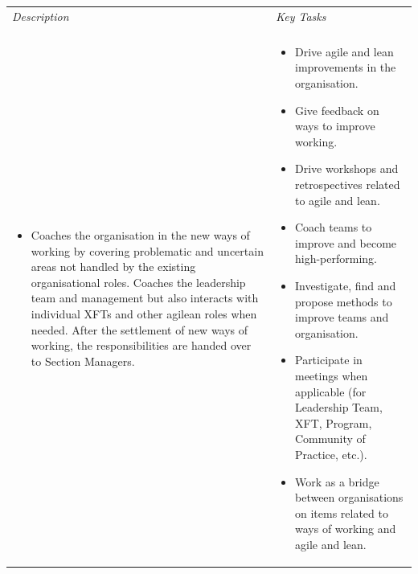 \begin{table}[h]
   \begin{tabularx}{\textwidth}{ | p{6.9cm} | p{6.9cm} | }
   
   \hline
   \emph{Description} & \emph{Key Tasks} \\ 
   \hhline{==}
   
   \multicolumn{2}{ | c | }{\textbf{Agile Coach}}
   
   \\ \hline
   
   \begin{itemize}[label={}, leftmargin=*, topsep=0pt, itemsep=0pt, partopsep=0pt]
     \item Coaches the organisation in the new ways of working by covering problematic and uncertain areas not handled by the existing organisational roles. Coaches the leadership team and management but also interacts with individual \acp{XFT} and other agilean roles when needed. After the settlement of new ways of working, the responsibilities are handed over to Section Managers. 
   \end{itemize} &
   
   \begin{itemize}[label={}, leftmargin=*, topsep=0pt, itemsep=0pt, partopsep=0pt]
     \item Drive agile and lean improvements in the organisation.
     \item Give feedback on ways to improve working.
     \item Drive workshops and retrospectives related to agile and lean.
     \item Coach teams to improve and become high-performing.
     \item Investigate, find and propose methods to improve teams and organisation.
     \item Participate in meetings when applicable (for Leadership Team, XFT, Program, Community of Practice, etc.).
     \item Work as a bridge between organisations on items related to ways of working and agile and lean.
   \end{itemize}
   
   \\ \hline
   
   \end{tabularx}
\end{table}

